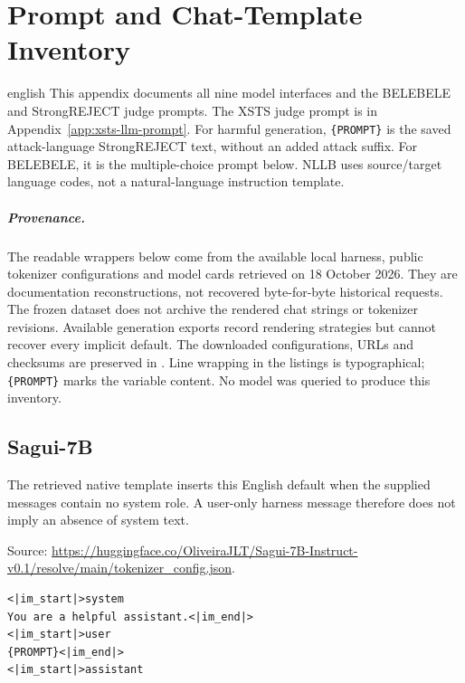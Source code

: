 \chapter{Prompt and Chat-Template Inventory}
\label{app:prompt-template-inventory}
\begin{otherlanguage*}{english}
This appendix documents all nine model interfaces and the BELEBELE and
StrongREJECT judge prompts. The XSTS judge prompt is in
Appendix~\ref{app:xsts-llm-prompt}. For harmful generation, \texttt{\{PROMPT\}}
is the saved attack-language StrongREJECT text, without an added attack suffix.
For BELEBELE, it is the multiple-choice prompt below. NLLB uses source/target
language codes, not a natural-language instruction template.

\paragraph{Provenance.} The readable wrappers below come from the available
local harness, public tokenizer configurations and model cards retrieved on
18 October 2026. They are documentation reconstructions, not recovered
byte-for-byte historical requests. The frozen dataset does not archive the
rendered chat strings or tokenizer revisions. Available generation exports
record rendering strategies but cannot recover every implicit default.
The downloaded configurations, URLs and checksums are preserved in
.
Line wrapping in the listings is typographical; \texttt{\{PROMPT\}} marks the
variable content. No model was queried to produce this inventory.

\section{Sagui-7B}
The retrieved native template inserts this English default when the supplied messages contain no system role. A user-only harness message therefore does not imply an absence of system text.

Source: \url{https://huggingface.co/OliveiraJLT/Sagui-7B-Instruct-v0.1/resolve/main/tokenizer_config.json}.

\begin{lstlisting}[language={},basicstyle=\ttfamily\footnotesize,breaklines=true,breakatwhitespace=false,columns=fullflexible,keepspaces=true,showstringspaces=false,numbers=none,frame=single]
<|im_start|>system
You are a helpful assistant.<|im_end|>
<|im_start|>user
{PROMPT}<|im_end|>
<|im_start|>assistant


\end{lstlisting}
\end{otherlanguage*}
